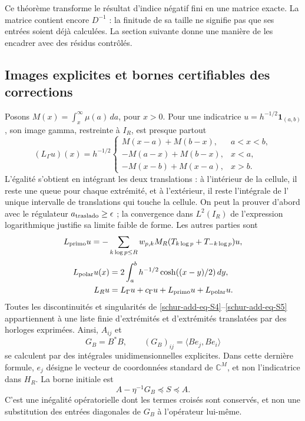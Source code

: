 Ce théorème transforme le résultat d'indice négatif fini en une matrice exacte. La matrice contient encore \(D^{-1}\) : la finitude de sa taille ne
signifie pas que ses entrées soient déjà calculées. La section suivante
donne une manière de les encadrer avec des résidus contrôlés.

\subsection{Images explicites et bornes certifiables des corrections}
\label{schur-add-sub-148}

Posons \(M(x)=\int_x^\infty\mu(a)\,da\), pour \(x>0\). Pour une indicatrice \(u=h^{-1/2}\mathbf1_{(a,b)}\), son image gamma, restreinte à \(I_R\), est presque partout
\begin{equation}
(L_\Gamma u)(x)=h^{-1/2}
\begin{cases}
M(x-a)+M(b-x),&a<x<b,\\
-M(a-x)+M(b-x),&x<a,\\
-M(x-b)+M(x-a),&x>b.
\end{cases}
\label{schur-add-eq-S4}
\end{equation}
L'égalité s'obtient en intégrant les deux translations : à l'intérieur de la
cellule, il reste une queue pour chaque extrémité, et à l'extérieur, il reste l'intégrale de l'
unique intervalle de translations qui touche la cellule. On peut la prouver d'abord
avec le régulateur \(a_{\rm traslado}\geq\epsilon\) ; la convergence dans
\(L^2(I_R)\) de l'expression logarithmique justifie sa limite faible de
forme. Les autres parties sont
\begin{equation}
L_{\rm primo}u=-\sum_{k\log p\leq R}w_{p,k}
M_R(T_{k\log p}+T_{-k\log p})u,
\label{schur-add-display-11}
\end{equation}
\begin{equation}
\begin{aligned}
L_{\rm polar}u(x)&=2\int_a^b h^{-1/2}\cosh((x-y)/2)\,dy,\\
L_Ru&=L_\Gamma u+c_\Gamma u+L_{\rm primo}u+L_{\rm polar}u.
\end{aligned}
\label{schur-add-eq-S5}
\end{equation}
Toutes les discontinuités et singularités de \eqref{schur-add-eq-S4}--\eqref{schur-add-eq-S5} appartiennent à une liste finie d'extrémités et d'extrémités translatées par des horloges exprimées. Ainsi, \(A_{ij}\) et
\begin{equation}
G_B=B^*B,\qquad (G_B)_{ij}=\langle Be_j,Be_i\rangle
\label{schur-add-display-13}
\end{equation}
se calculent par des intégrales unidimensionnelles explicites. Dans cette dernière
formule, \(e_j\) désigne le vecteur de coordonnées standard de
\(\mathbb C^M\), et non l'indicatrice dans \(H_R\).
La borne initiale est
\begin{equation}
A-\eta^{-1}G_B\preceq S\preceq A.
\label{schur-add-eq-S6}
\end{equation}
C'est une inégalité opératorielle dont les termes croisés sont conservés, et non une substitution des entrées diagonales de \(G_B\) à l'opérateur lui-même.

